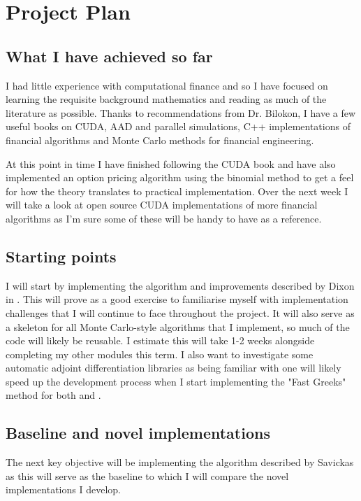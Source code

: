 \chapter{Project Plan}

\section{What I have achieved so far}
I had little experience with computational finance and so I have focused on learning the requisite background mathematics and reading as much of the literature as possible. Thanks to recommendations from Dr. Bilokon, I have a few useful books on CUDA, AAD and parallel simulations, C++ implementations of financial algorithms and Monte Carlo methods for financial engineering.

At this point in time I have finished following the CUDA book \cite{sanders2010cuda} and have also implemented an option pricing algorithm using the binomial method to get a feel for how the theory translates to practical implementation. Over the next week I will take a look at open source CUDA implementations of more financial algorithms as I'm sure some of these will be handy to have as a reference.

\section{Starting points} \label{sec:StartingPoints}
I will start by implementing the algorithm and improvements described by Dixon in \cite{dixon2012monte}. This will prove as a good exercise to familiarise myself with implementation challenges that I will continue to face throughout the project. It will also serve as a skeleton for all Monte Carlo-style algorithms that I implement, so much of the code will likely be reusable. I estimate this will take 1-2 weeks alongside completing my other modules this term. I also want to investigate some automatic adjoint differentiation libraries as being familiar with one will likely speed up the development process when I start implementing the "Fast Greeks" \cite{giles2005smoking} method for both \cite{dixon2012monte} and \cite{savickas2014super}.

\section{Baseline and novel implementations} \label{sec:BaselineAndNovelImplementations}
The next key objective will be implementing the algorithm described by Savickas \cite{savickas2014super} as this will serve as the baseline to which I will compare the novel implementations I develop. 

